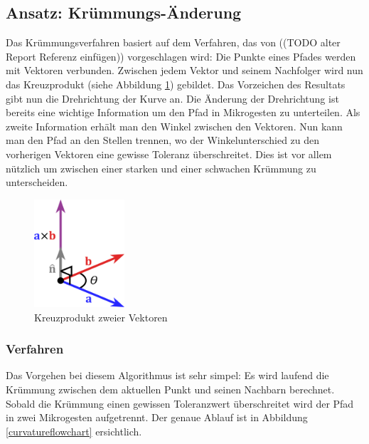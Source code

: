 
\subsection{Ansatz: Krümmungs-Änderung}

Das Krümmungsverfahren basiert auf dem Verfahren, das von ((TODO alter Report Referenz einfügen)) vorgeschlagen wird: Die Punkte eines Pfades werden mit Vektoren verbunden. Zwischen jedem Vektor und seinem Nachfolger wird nun das Kreuzprodukt (siehe Abbildung \ref{kreuzprodukt}) gebildet. Das Vorzeichen des Resultats gibt nun die Drehrichtung der Kurve an. Die Änderung der Drehrichtung ist bereits eine wichtige Information um den Pfad in Mikrogesten zu unterteilen.
Als zweite Information erhält man den Winkel zwischen den Vektoren. Nun kann man den Pfad an den Stellen trennen, wo der Winkelunterschied zu den vorherigen Vektoren eine gewisse Toleranz überschreitet. Dies ist vor allem nützlich um zwischen einer starken und einer schwachen Krümmung zu unterscheiden.

\begin{figure}[h!]
  \centering
    \includegraphics[width=0.3\textwidth]{./img/crossproduct.pdf}
  \caption{Kreuzprodukt zweier Vektoren}
  \label{kreuzprodukt}
\end{figure}

\subsubsection{Verfahren}
Das Vorgehen bei diesem Algorithmus ist sehr simpel: Es wird laufend die Krümmung zwischen dem aktuellen Punkt und seinen Nachbarn berechnet. Sobald die Krümmung einen gewissen Toleranzwert überschreitet wird der Pfad in zwei Mikrogesten aufgetrennt. Der genaue Ablauf ist in Abbildung \ref{curvatureflowchart} ersichtlich.

